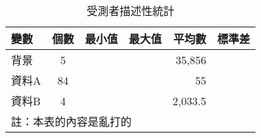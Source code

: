 \begin{table}[htbp]
\centering

\caption{受測者描述性統計}
\label{t:a}

\begin{adjustbox}{max width=0.95\textwidth}
\begin{tabular}{lcccrc} %

\toprule
變數  & 個數 & 最小值 & 最大值 & 平均數      & 標準差 \\ 
\midrule
背景  & 5   &       &       &  35,856    &       \\
資料A & 84  &       &       &  55        &       \\
資料B & 4   &       &       &  2,033.5   &       \\
\bottomrule
\multicolumn{6}{l}{註：本表的內容是亂打的}

\end{tabular}
\end{adjustbox}
\end{table}
